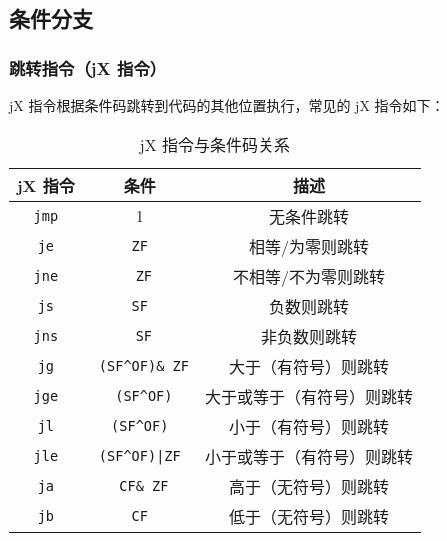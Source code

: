 \subsection{条件分支}
\subsubsection{跳转指令（jX 指令）}
jX 指令根据条件码跳转到代码的其他位置执行，常见的 jX 指令如下：
\begin{table}[H]
    \captionsetup{skip=4pt}
    \centering
    \setlength{\arrayrulewidth}{1pt}
    \begin{tabular}{ccc}
        \hline
        jX 指令                 & 条件                              & 描述            \\
        \hline
        \texttt{jmp} & 1                               & 无条件跳转         \\
        \texttt{je}  & \texttt{ZF}            & 相等/为零则跳转      \\
        \texttt{jne} & \texttt{~ZF}           & 不相等/不为零则跳转    \\
        \texttt{js}  & \texttt{SF}            & 负数则跳转         \\
        \texttt{jns} & \texttt{~SF}           & 非负数则跳转        \\
        \texttt{jg}  & \texttt{~(SF^OF)\&~ZF} & 大于（有符号）则跳转    \\
        \texttt{jge} & \texttt{~(SF^OF)}      & 大于或等于（有符号）则跳转 \\
        \texttt{jl}  & \texttt{(SF^OF)}       & 小于（有符号）则跳转    \\
        \texttt{jle} & \texttt{(SF^OF)|ZF}    & 小于或等于（有符号）则跳转 \\
        \texttt{ja}  & \texttt{~CF\&~ZF}      & 高于（无符号）则跳转    \\
        \texttt{jb}  & \texttt{CF}            & 低于（无符号）则跳转    \\
        \hline
    \end{tabular}
    \caption{jX 指令与条件码关系}
\end{table}


